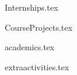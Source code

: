 \documentclass[11pt, a4paper]{awesome-cv}
\newcommand*{\sectiondir}{resume/}
\begin{document}

\vspace*{42mm}

\vspace*{-0.2cm}
{Internships.tex}

\vspace*{-0.54cm}
{CourseProjects.tex}

\vspace*{-0.54cm}
{academics.tex}



\vspace*{-0.54cm}
{extraactivities.tex}







\end{document}
